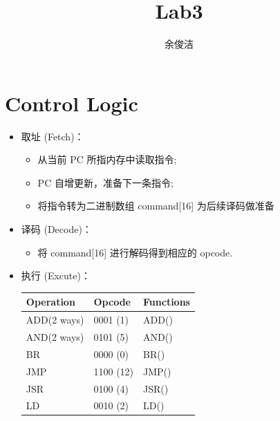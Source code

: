 \documentclass[runningheads]{llncs}
\begin{document}
\title{Lab3}
%
%
\author{余俊洁 }
%
%

\maketitle
\section{Control Logic}
\begin{itemize}
    \item 取址 (Fetch)：
    \begin{itemize}
        \item 从当前 PC 所指内存中读取指令;
        \item PC 自增更新，准备下一条指令;
        \item 将指令转为二进制数组 command[16] 为后续译码做准备
    \end{itemize}
    \item 译码 (Decode)：
    \begin{itemize}
        \item 将 command[16] 进行解码得到相应的 opcode.        
    \end{itemize}
    \item 执行 (Excute)：
    \begin{itemize}
        \begin{table}[H]
            \centering 
            \begin{tabular}{|m{5cm}<{\centering}|m{2cm}<{\centering}|m{2cm}<{\centering}|}
            \hline
                \textbf{Operation} & \textbf{Opcode} & \textbf{Functions}\\ \hline
                ADD(2 ways) & 0001 (1) & ADD()\\ \hline
                AND(2 ways) & 0101 (5) & AND()\\ \hline
                BR & 0000 (0) & BR()\\ \hline
                JMP & 1100 (12) & JMP()\\ \hline
                JSR & 0100 (4) & JSR()\\ \hline
                LD & 0010 (2) & LD()\\ \hline 

\end{tabular}
\end{table}
\end{itemize}
\end{itemize}
\end{document}
